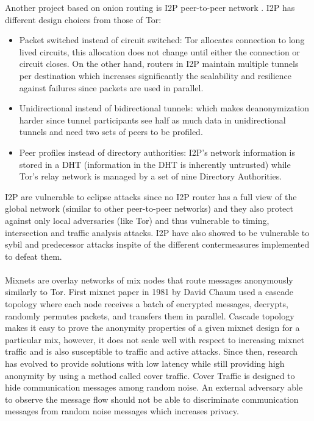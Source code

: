 Another project based on onion routing is I2P peer-to-peer network \cite{i2p}. I2P has different design choices from those of Tor:
\begin{itemize}
    \item Packet switched instead of circuit switched: Tor allocates connection to long lived circuits, this allocation does not change until either the connection or circuit closes. On the other hand, routers in I2P maintain multiple tunnels per destination which increases significantly the scalability and resilience against failures since packets are used in parallel.
    \item Unidirectional instead of bidirectional tunnels: which makes deanonymization harder since tunnel participants see half as much data in unidirectional tunnels and need two sets of peers to be profiled.
    \item Peer profiles instead of directory authorities: I2P’s network information is stored in a DHT (information in the DHT is inherently untrusted) while Tor’s relay network is managed by a set of nine Directory Authorities.

\end{itemize}
I2P are vulnerable to eclipse attacks since no I2P router has a full view of the global network (similar to other peer-to-peer networks) and they also protect against only local adversaries (like Tor) and thus vulnerable to timing, intersection and traffic analysis attacks. I2P have also showed to be vulnerable to sybil and predecessor attacks inspite of the different contermeasures implemented to defeat them.
\\~\\Mixnets are overlay networks of mix nodes that route messages anonymously similarly to Tor. First mixnet paper in 1981 by David Chaum \cite{mixnets} used a cascade topology where each node receives a batch of encrypted messages, decrypts, randomly permutes packets, and transfers them in parallel. Cascade topology makes it easy to prove the anonymity properties of a given mixnet design for a particular mix, however, it does not scale well with respect to increasing mixnet traffic and is also susceptible to traffic and active attacks. Since then, research has evolved to provide solutions with low latency while still providing high anonymity by using a method called cover traffic. Cover Traffic is designed to hide communication messages among random noise. An external adversary able to observe the message flow should not be able to discriminate communication messages from random noise messages which increases privacy.
